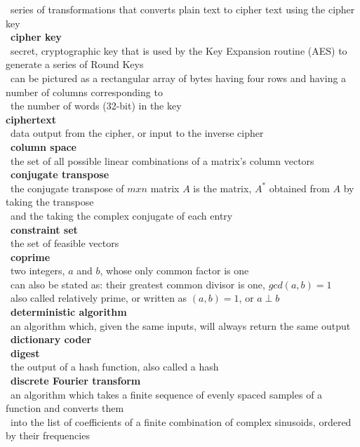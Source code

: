 \documentclass[10pt,letterpaper]{scrartcl}
\newcommand{\tbul}{\textbullet}
\newcommand{\tend}{\>\textendash}
\newcommand{\tasc}{\>\>\textasteriskcentered}
\begin{document}
\begin{tabbing}
    \tend\ series of transformations that converts plain text to cipher text using the cipher key \\
\tbul\ \textbf{cipher key} \\ 
    \tend\ secret, cryptographic key that is used by the Key Expansion routine (AES) to generate a series of Round Keys \\
    \tasc\ can be pictured as a rectangular array of bytes having four rows and having a number of columns corresponding to\\ \>\ the number of words (32-bit) in the key \\
\tbul \textbf{ciphertext} \\
    \tend\ data output from the cipher, or input to the inverse cipher \\
\tbul\ \textbf{column space} \\
    \tend\ the set of all possible linear combinations of a matrix's column vectors \\
\tbul\ \textbf{conjugate transpose} \\
    \tend\ the conjugate transpose of $mxn$ matrix $A$ is the matrix, $A^*$ obtained from $A$ by taking the transpose \\ \>\ and the taking the complex conjugate of each entry \\
\tbul\ \textbf{constraint set} \\
    \tend\ the set of feasible vectors \\
\tbul\ \textbf{coprime} \\
    \tend\ two integers, $a$ and $b$, whose only common factor is one \\
    \tend\ can also be stated as: their greatest common divisor is one, $gcd(a,b)=1$ \\
    \tend\ also called relatively prime, or written as $(a,b)=1$, or $a\perp b$ \\
\tbul\ \textbf{deterministic algorithm} \\
    \tend\ an algorithm which, given the same inputs, will always return the same output\\
\tbul\ \textbf{dictionary coder} \\
\tbul\ \textbf{digest} \\
    \tend\ the output of a hash function, also called a hash \\
\tbul\ \textbf{discrete Fourier transform} \\
    \tend\ an algorithm which takes a finite sequence of evenly spaced samples of a function and converts them \\ \>\ into the list of coefficients of a finite combination of complex sinusoids, ordered by their frequencies \\

\end{tabbing}
\end{document}
